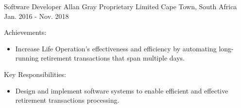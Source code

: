 \begin{cventries}
  \cventry
    {Software Developer} %
    {Allan Gray Proprietary Limited} %
    {Cape Town, South Africa} %
    {Jan. 2016 - Nov. 2018} %
    {
      \begin{cvitems} %
        \item {Achievements:}
        \begin{itemize}
          \item {Increase Life Operation's effectiveness and efficiency by automating long-running retirement transactions that span multiple days.}
        \end{itemize}
        \item {Key Responsibilities:}
        \begin{itemize}
          \item {Design and implement software systems to enable efficient and effective retirement transactions processing.}
        \end{itemize}
      \end{cvitems}
    }



\end{cventries}
